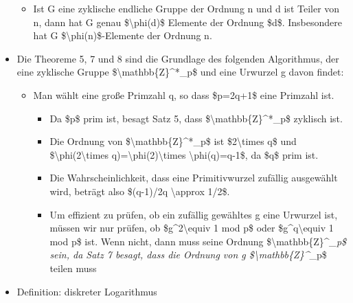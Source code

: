 \documentclass[a4paper]{article}
\begin{document}
\begin{multicols}{3}
\begin{itemize}
              \begin{itemize}
                  \item
                        Ist G eine zyklische endliche Gruppe der Ordnung n und d ist Teiler
                        von n, dann hat G genau \$\textbackslash phi(d)\$ Elemente der
                        Ordnung \$d\$. Insbesondere hat G \$\textbackslash phi(n)\$-Elemente
                        der Ordnung n.
              \end{itemize}
        \item
              Die Theoreme 5, 7 und 8 sind die Grundlage des folgenden Algorithmus,
              der eine zyklische Gruppe \$\textbackslash mathbb\{Z\}\^{}*\_p\$ und
              eine Urwurzel g davon findet:

              \begin{itemize}
                  \item
                        Man wählt eine große Primzahl q, so dass \$p=2q+1\$ eine Primzahl
                        ist.

                        \begin{itemize}
                            \item
                                  Da \$p\$ prim ist, besagt Satz 5, dass
                                  \$\textbackslash mathbb\{Z\}\^{}*\_p\$ zyklisch ist.
                            \item
                                  Die Ordnung von \$\textbackslash mathbb\{Z\}\^{}*\_p\$ ist
                                  \$2\textbackslash times q\$ und
                                  \$\textbackslash phi(2\textbackslash times
                                  q)=\textbackslash phi(2)\textbackslash times
                                  \textbackslash phi(q)=q-1\$, da \$q\$ prim ist.
                            \item
                                  Die Wahrscheinlichkeit, dass eine Primitivwurzel zufällig
                                  ausgewählt wird, beträgt also \$(q-1)/2q \textbackslash approx
                                  1/2\$.
                            \item
                                  Um effizient zu prüfen, ob ein zufällig gewähltes g eine Urwurzel
                                  ist, müssen wir nur prüfen, ob \$g\^{}2\textbackslash equiv 1 mod
                                  p\$ oder \$g\^{}q\textbackslash equiv 1 mod p\$ ist. Wenn nicht,
                                  dann muss seine Ordnung
                                  \$\textbar\textbackslash mathbb\{Z\}\^{}\emph{\_p\textbar\$ sein,
                                  da Satz 7 besagt, dass die Ordnung von g
                                  \$\textbar\textbackslash mathbb\{Z\}\^{}}\_p\textbar\$ teilen muss
                        \end{itemize}
              \end{itemize}
        \item
              Definition: diskreter Logarithmus


\end{itemize}
\end{multicols}
\end{document}

